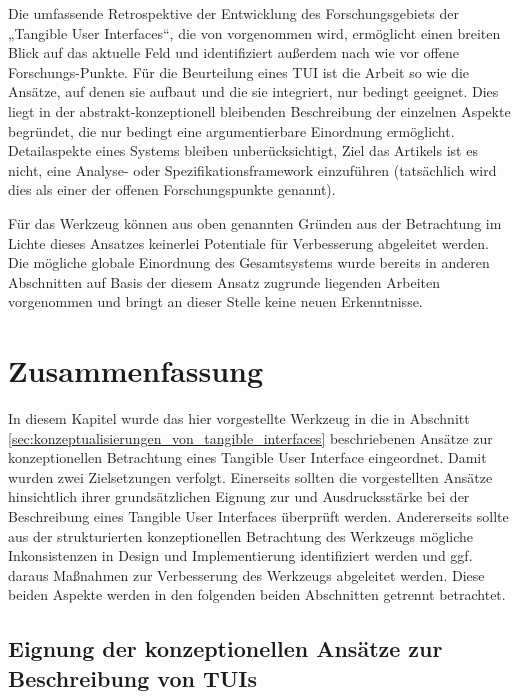 Die umfassende Retrospektive der Entwicklung des Forschungsgebiets der „Tangible User Interfaces“, die von \citep{Ishii08} vorgenommen wird, ermöglicht einen breiten Blick auf das aktuelle Feld und identifiziert außerdem nach wie vor offene Forschungs-Punkte. Für die Beurteilung eines \gls{TUI} ist die Arbeit so wie die Ansätze, auf denen sie aufbaut und die sie integriert, nur bedingt geeignet. Dies liegt in der abstrakt-konzeptionell bleibenden Beschreibung der einzelnen Aspekte begründet, die nur bedingt eine argumentierbare Einordnung ermöglicht. Detailaspekte eines Systems bleiben unberücksichtigt, Ziel das Artikels ist es nicht, eine Analyse- oder Spezifikationsframework einzuführen (tatsächlich wird dies als einer der offenen Forschungspunkte genannt).

Für das Werkzeug können aus oben genannten Gründen aus der Betrachtung im Lichte dieses Ansatzes keinerlei Potentiale für 
Verbesserung abgeleitet werden. Die mögliche globale Einordnung des Gesamtsystems wurde bereits in anderen Abschnitten auf Basis der diesem Ansatz zugrunde liegenden Arbeiten vorgenommen und bringt an dieser Stelle keine neuen Erkenntnisse.


\section{Zusammenfassung} %
\label{sec:konz_eval_zusammenfassung}

In diesem Kapitel wurde das hier vorgestellte Werkzeug in die in Abschnitt \ref{sec:konzeptualisierungen_von_tangible_interfaces} beschriebenen Ansätze zur konzeptionellen Betrachtung eines Tangible User Interface eingeordnet. Damit wurden zwei Zielsetzungen verfolgt. Einerseits sollten die vorgestellten Ansätze hinsichtlich ihrer grundsätzlichen Eignung zur und Ausdrucksstärke bei der Beschreibung eines Tangible User Interfaces überprüft werden. Andererseits sollte aus der strukturierten konzeptionellen Betrachtung des Werkzeugs mögliche Inkonsistenzen in Design und Implementierung identifiziert werden und ggf. daraus Maßnahmen zur Verbesserung des Werkzeugs abgeleitet werden. Diese beiden Aspekte werden in den folgenden beiden Abschnitten getrennt betrachtet.

\subsection{Eignung der konzeptionellen Ansätze zur Beschreibung von TUIs} %
\label{sub:eignung_der_konzeptionellen_ansätze}

